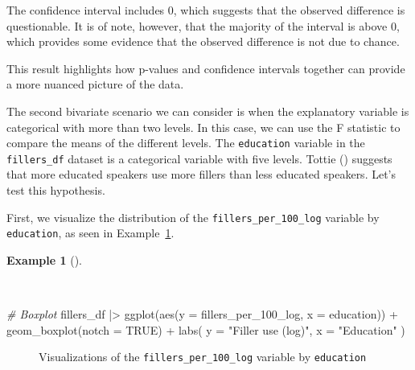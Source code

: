 \documentclass[
  letterpaper,
  DIV=11,
  numbers=noendperiod]{scrreprt}
\newenvironment{Shaded}{\begin{snugshade}}{\end{snugshade}}
\newcommand{\AttributeTok}[1]{\textcolor[rgb]{0.00,0.00,0.00}{#1}}
\newcommand{\CommentTok}[1]{\textcolor[rgb]{0.00,0.00,0.00}{\textit{#1}}}
\newcommand{\ConstantTok}[1]{\textcolor[rgb]{0.00,0.00,0.00}{#1}}
\newcommand{\FunctionTok}[1]{\textcolor[rgb]{0.00,0.00,0.00}{#1}}
\newcommand{\NormalTok}[1]{\textcolor[rgb]{0.00,0.00,0.00}{#1}}
\newcommand{\SpecialCharTok}[1]{\textcolor[rgb]{0.00,0.00,0.00}{#1}}
\newcommand{\StringTok}[1]{\textcolor[rgb]{0.00,0.00,0.00}{#1}}
\theoremstyle{definition}
\newtheorem{example}{Example}[chapter]
\theoremstyle{remark}
\begin{document}
The confidence interval includes 0, which suggests that the observed
difference is questionable. It is of note, however, that the majority of
the interval is above 0, which provides some evidence that the observed
difference is not due to chance.

This result highlights how p-values and confidence intervals together
can provide a more nuanced picture of the data.

The second bivariate scenario we can consider is when the explanatory
variable is categorical with more than two levels. In this case, we can
use the F statistic to compare the means of the different levels. The
\texttt{education} variable in the \texttt{fillers\_df} dataset is a
categorical variable with five levels. Tottie
() suggests that more educated speakers
use more fillers than less educated speakers. Let's test this
hypothesis.

First, we visualize the distribution of the
\texttt{fillers\_per\_100\_log} variable by \texttt{education}, as seen
in Example~\ref{exm-ida-num-bi-edu-vis}.

\begin{example}[]\protect\hypertarget{exm-ida-num-bi-edu-vis}{}\label{exm-ida-num-bi-edu-vis}

~

\begin{Shaded}
\begin{Highlighting}[]
\CommentTok{\# Boxplot}
\NormalTok{fillers\_df }\SpecialCharTok{|\textgreater{}}
  \FunctionTok{ggplot}\NormalTok{(}\FunctionTok{aes}\NormalTok{(}\AttributeTok{y =}\NormalTok{ fillers\_per\_100\_log, }\AttributeTok{x =}\NormalTok{ education)) }\SpecialCharTok{+}
  \FunctionTok{geom\_boxplot}\NormalTok{(}\AttributeTok{notch =} \ConstantTok{TRUE}\NormalTok{) }\SpecialCharTok{+}
  \FunctionTok{labs}\NormalTok{(}
    \AttributeTok{y =} \StringTok{"Filler use (log)"}\NormalTok{,}
    \AttributeTok{x =} \StringTok{"Education"}
\NormalTok{  )}
\end{Highlighting}
\end{Shaded}

\begin{figure}[H]


\caption{\label{fig-ida-num-bi-edu-vis}Visualizations of the
\texttt{fillers\_per\_100\_log} variable by \texttt{education}}

\end{figure}%

\end{example}
\end{document}
